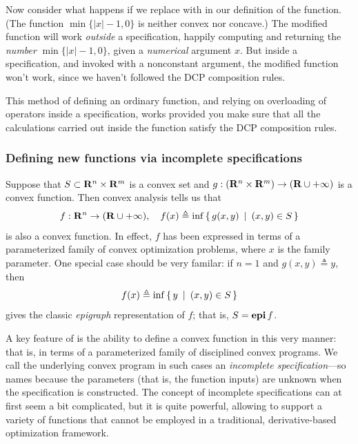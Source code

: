 \documentclass[12pt]{article}
\begin{document}
Now consider what happens if we replace \verb@max@ with \verb@min@
in our definition of the \verb@deadzone@ function.
(The function $\min \{ |x|-1, 0 \}$ is neither convex nor concave.)
The modified function will work \emph{outside}
a \cvx specification, happily computing and returning 
the \emph{number} $\min \{|x|-1,0\}$, given a \emph{numerical}
argument $x$.
But inside a \cvx specification, and invoked 
with a nonconstant argument,
the modified function won't work,
since we haven't followed the DCP composition rules.

This method of defining an ordinary function, and relying on
overloading of operators inside a \cvx specification,
works provided you make sure that all the 
calculations carried out inside
the function satisfy the DCP composition rules.

\subsubsection{Defining new functions via incomplete specifications}

Suppose that $S\subset\R^n\times\R^m$ is a convex set and 
$g:(\R^n\times\R^m)\rightarrow(\R\cup+\infty)$ is a convex function.
Then convex analysis tells us that
\begin{equation}
	\label{eq:partial}
	f:\R^n\rightarrow(\R\cup+\infty), \quad f(x) \triangleq \inf\Condset{g(x,y)}{(x,y)\in S }
\end{equation}
is also a convex function. In effect, $f$
has been expressed in terms of a parameterized 
family of convex optimization problems, where $x$ is
the family parameter.
One special case should be very familar: if $n=1$ and
$g(x,y)\triangleq y$, then
\begin{equation}
	f(x) \triangleq \inf\left\{\,y\,~|~\,(x,y)\in S\,\right\}
\end{equation}
gives the classic \emph{epigraph} representation of $f$; that is, $S=\operatorname{\textbf{epi}} f$.

A key feature of \cvx is the ability to define a convex
function in this very manner: that is, in terms of a 
parameterized family of disciplined convex programs. 
We call the underlying convex program in such cases
an \emph{incomplete specification}---so names because
the parameters (that is, the function inputs)
are unknown when the specification is
constructed. The concept of incomplete 
specifications can at first seem a bit complicated,
but it is quite powerful, allowing
\cvx to support a variety of functions that cannot be
employed in a traditional, derivative-based optimization framework.
\end{document}
